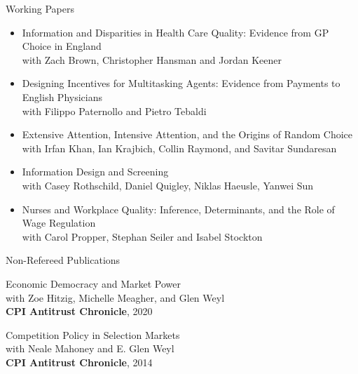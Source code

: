 \documentclass{resume}
\begin{document}
\begin{rSection}{Working Papers}

\begin{itemize}
	\item Information and Disparities in Health Care Quality: Evidence from GP Choice in England \\ 
	with Zach Brown, Christopher Hansman and Jordan Keener

	\item Designing Incentives for Multitasking Agents: Evidence from Payments to English Physicians\\ 
	with Filippo Paternollo and Pietro Tebaldi
	
	\item Extensive Attention, Intensive Attention, and the Origins of Random Choice\\ 
	with Irfan Khan, Ian Krajbich, Collin Raymond, and Savitar Sundaresan
	
	\item Information Design and Screening \\ 
	with Casey Rothschild, Daniel Quigley, Niklas Haeusle, Yanwei Sun
	
	\item Nurses and Workplace Quality: Inference, Determinants, and the Role of Wage Regulation \\ 
	with Carol Propper, Stephan Seiler and Isabel Stockton


\end{itemize}




\end{rSection}











\begin{rSection}{Non-Refereed Publications}
	
\begin{etaremune}

\item Economic Democracy and Market Power\\
with Zoe Hitzig, Michelle Meagher, and Glen Weyl \\ 
\textbf{CPI Antitrust Chronicle}, 2020


\item Competition Policy in Selection Markets\\ 
with Neale Mahoney and E. Glen Weyl \\ 
\textbf{CPI Antitrust Chronicle}, 2014
	
		
\end{etaremune}


\end{rSection}
\end{document}
